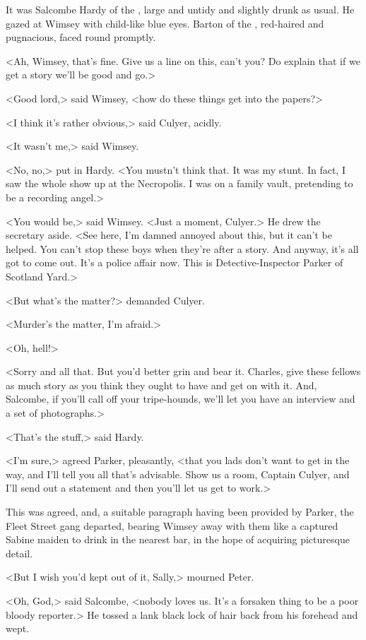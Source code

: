 It was Salcombe Hardy of the , large and untidy and slightly drunk as usual. He gazed at Wimsey with child-like blue eyes. Barton of the , red-haired and pugnacious, faced round promptly.

<Ah, Wimsey, that's fine. Give us a line on this, can't you? Do explain that if we get a story we'll be good and go.>

<Good lord,> said Wimsey, <how do these things get into the papers?>

<I think it's rather obvious,> said Culyer, acidly.

<It wasn't me,> said Wimsey.

<No, no,> put in Hardy. <You mustn't think that. It was my stunt. In fact, I saw the whole show up at the Necropolis. I was on a family vault, pretending to be a recording angel.>

<You would be,> said Wimsey. <Just a moment, Culyer.> He drew the secretary aside. <See here, I'm damned annoyed about this, but it can't be helped. You can't stop these boys when they're after a story. And anyway, it's all got to come out. It's a police affair now. This is Detective-Inspector Parker of Scotland Yard.>

<But what's the matter?> demanded Culyer.

<Murder's the matter, I'm afraid.>

<Oh, hell!>

<Sorry and all that. But you'd better grin and bear it. Charles, give these fellows as much story as you think they ought to have and get on with it. And, Salcombe, if you'll call off your tripe-hounds, we'll let you have an interview and a set of photographs.>

<That's the stuff,> said Hardy.

<I'm sure,> agreed Parker, pleasantly, <that you lads don't want to get in the way, and I'll tell you all that's advisable. Show us a room, Captain Culyer, and I'll send out a statement and then you'll let us get to work.>

This was agreed, and, a suitable paragraph having been provided by Parker, the Fleet Street gang departed, bearing Wimsey away with them like a captured Sabine maiden to drink in the nearest bar, in the hope of acquiring picturesque detail.

<But I wish you'd kept out of it, Sally,> mourned Peter.

<Oh, God,> said Salcombe, <nobody loves us. It's a forsaken thing to be a poor bloody reporter.> He tossed a lank black lock of hair back from his forehead and wept.

